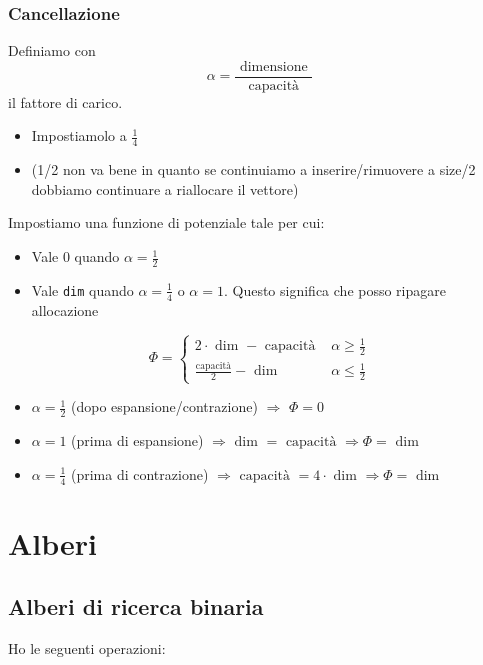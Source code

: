 \subsubsection{Cancellazione}
Definiamo con
\[
	\alpha = \frac{\text{ dimensione }}{\text{ capacità }}
\]
il fattore di carico.
\begin{itemize}
	\item Impostiamolo a $ \frac{1}{4} $
	\item   (1/2  non va bene in quanto se continuiamo a inserire/rimuovere a size/2 dobbiamo continuare a riallocare il vettore)
\end{itemize}
Impostiamo una funzione di potenziale tale per cui:
\begin{itemize}
	\item Vale 0 quando $ \alpha = \frac{1}{2} $
	\item Vale \verb|dim| quando $ \alpha  = \frac{1}{4} $ o $ \alpha  = 1 $. Questo significa che posso ripagare allocazione
\end{itemize}
\[
	\Phi =
	\begin{cases}
		2 \cdot \text{ dim } - \text{ capacità } & \alpha \geq \frac{1}{2} \\
		\frac{\text{capacità}}{2} - \text{ dim } & \alpha \leq \frac{1}{2}
	\end{cases}
\]

\begin{itemize}
	\item $\alpha = \frac{1}{2}$ (dopo espansione/contrazione) $\Rightarrow$ \(\Phi = 0\)
	\item $\alpha = 1$ (prima di espansione) $\Rightarrow \text{ dim } = \text{ capacità } \Rightarrow \Phi = \text{ dim } $
	\item $\alpha = \frac{1}{4}$ (prima di contrazione) $\Rightarrow \text{ capacità } = 4 \cdot \text{ dim } \Rightarrow \Phi = \text{ dim }$
\end{itemize}

\section{Alberi}
\subsection{Alberi di ricerca binaria}
Ho le seguenti operazioni:

